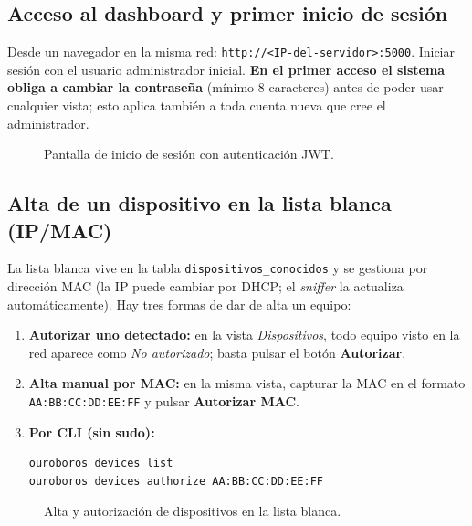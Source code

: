 \documentclass[12pt,letterpaper]{report}
\begin{document}
\subsection{Acceso al dashboard y primer inicio de sesión}

Desde un navegador en la misma red:
\texttt{http://<IP-del-servidor>:5000}. Iniciar sesión con el usuario
administrador inicial. \textbf{En el primer acceso el sistema obliga a
cambiar la contraseña} (mínimo 8 caracteres) antes de poder usar cualquier
vista; esto aplica también a toda cuenta nueva que cree el administrador.

\begin{figure}[H]
\centering
{}
\caption{Pantalla de inicio de sesión con autenticación JWT.}
\label{fig:login}
\end{figure}

\subsection{Alta de un dispositivo en la lista blanca (IP/MAC)}
\label{sec:altamac}

La lista blanca vive en la tabla \texttt{dispositivos\_conocidos} y se
gestiona por dirección MAC (la IP puede cambiar por DHCP; el \textit{sniffer}
la actualiza automáticamente). Hay tres formas de dar de alta un equipo:

\begin{enumerate}[nosep]
  \item \textbf{Autorizar uno detectado:} en la vista
        \textit{Dispositivos}, todo equipo visto en la red aparece como
        \textit{No autorizado}; basta pulsar el botón \textbf{Autorizar}.
  \item \textbf{Alta manual por MAC:} en la misma vista, capturar la MAC en
        el formato \texttt{AA:BB:CC:DD:EE:FF} y pulsar
        \textbf{Autorizar MAC}.
  \item \textbf{Por CLI (sin sudo):}
\begin{lstlisting}[language=bash]
ouroboros devices list
ouroboros devices authorize AA:BB:CC:DD:EE:FF
\end{lstlisting}
\end{enumerate}

\begin{figure}[H]
\centering
{}
\caption{Alta y autorización de dispositivos en la lista blanca.}
\label{fig:whitelist}
\end{figure}
\end{document}
